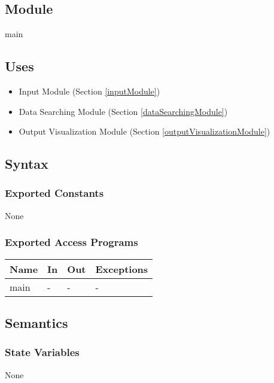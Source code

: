 \documentclass[12pt, titlepage]{article}
\begin{document}

\subsection{Module}

main

\subsection{Uses}
\begin{itemize}
\item Input Module (Section \ref{inputModule})
\item Data Searching Module (Section \ref{dataSearchingModule})
\item Output Visualization Module (Section \ref{outputVisualizationModule})
\end{itemize}


\subsection{Syntax}

\subsubsection{Exported Constants}

None

\subsubsection{Exported Access Programs}

\begin{center}
\begin{tabular}{p{2cm} p{5cm} p{4cm} p{2cm}}
\hline
\textbf{Name} & \textbf{In} & \textbf{Out} & \textbf{Exceptions} \\
\hline
main & -  & - & - \\
\hline
\end{tabular}
\end{center}

\subsection{Semantics}

\subsubsection{State Variables}
None
\end{document}
